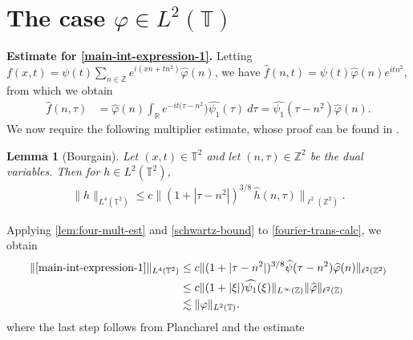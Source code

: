 \documentclass[12pt,reqno]{amsart}
\newcommand{\wh}{\widehat}
\newcommand{\rr}{\mathbb{R}}
\newcommand{\zz}{\mathbb{Z}}
\newcommand{\ci}{\mathbb{T}}
\newcommand{\vp}{\varphi}
\theoremstyle{plain}  %
\newtheorem{lemma}{Lemma}
\begin{document}
\section{The case $\vp \in L^2(\ci)$}
\label{sec:s=0}
%
%
%
%
%
%
%
%
%
%
\vskip0.1in
{\bf Estimate for \eqref{main-int-expression-1}.}
Letting $f(x,t) = \psi(t) \sum_{n \in \zz} e^{i(xn + tn^2)} 
\wh{\vp}(n)$, we have $\wh{f}(n,t) = \psi(t) \wh{\vp}(n) e^{itn^2}$,
from which we obtain
%
%
\begin{equation}
	\label{fourier-trans-calc}
	\begin{split}
		\wh{f}(n, \tau)
		& = \wh{\vp}(n) \int_\rr e^{-it( \tau - n^2}) 
		\wh{\psi_1}(\tau) \ d\tau
		= \wh{\psi_1}(\tau - n^2) \wh{\vp}(n).
	\end{split}
\end{equation}
%
%
We now require the following multiplier estimate, whose proof can be found in 
\cite{Bourgain-Fourier-transfo-1}. %
%
%
%
%
%
%
%
\begin{lemma}[Bourgain]
	\label{lem:four-mult-est}
	Let $(x, t) \in \ci^2$ and let $(n, \tau) \in \zz^2$ 
	be the dual variables. Then for $h \in L^2(\ci^2)$,
%
\begin{equation}
	\label{four-mult-est}
	\begin{split}
		\|h\|_{L^4(\ci^2)} \le c \|(1 + |\tau - 
		n^2|)^{3/8} \, \wh{h}(n, \tau) \|_{\ell^2(\zz^2)}.
	\end{split}
\end{equation}
%
%
\end{lemma}
%
%
%
%
%
%
%
Applying \autoref{lem:four-mult-est} and \eqref{schwartz-bound} to
\eqref{fourier-trans-calc}, we obtain
%
%
\begin{equation}
	\label{main-int-est-part-1}
	\begin{split}
		\|\eqref{main-int-expression-1}\|_{L^4(\ci^2)} 
		& \le c  \|(1 + |\tau - 
		n^2|)^{3/8} \wh{\psi}(\tau - n^2) 		\wh{\vp}(n) \|_{\ell^2(\zz^2)}
		\\
		& \le c \|(1 + |\xi|)  \wh{\psi_1}(\xi)\|_{L^\infty(\zz)} 
		\|\wh{\vp} \|_{\ell^2(\zz)}
		\\
		& \lesssim \|\vp \|_{L^2(\ci)}.
	\end{split}
\end{equation}
where the last step follows from Plancharel and the estimate
\end{document}
